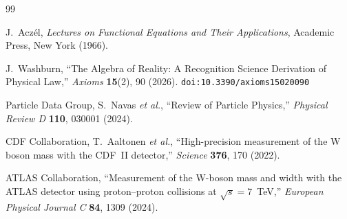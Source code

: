 \documentclass[12pt,a4paper]{article}
\theoremstyle{definition}
\theoremstyle{remark}
\begin{document}
\begin{thebibliography}{99}

J.~Acz\'el, \emph{Lectures on Functional Equations and Their Applications},
Academic Press, New York (1966).

J.~Washburn, ``The Algebra of Reality: A Recognition Science Derivation
of Physical Law,'' \emph{Axioms} \textbf{15}(2), 90 (2026).
\texttt{doi:10.3390/axioms15020090}

Particle Data Group, S.~Navas \textit{et al.},
``Review of Particle Physics,''
\emph{Physical Review D} \textbf{110}, 030001 (2024).

CDF Collaboration, T.~Aaltonen \textit{et al.},
``High-precision measurement of the W boson mass with the CDF~II
detector,'' \emph{Science} \textbf{376}, 170 (2022).

ATLAS Collaboration, ``Measurement of the W-boson mass and width with
the ATLAS detector using proton--proton collisions at $\sqrt{s} =
7$~TeV,'' \emph{European Physical Journal C} \textbf{84}, 1309 (2024).

\end{thebibliography}
\end{document}
